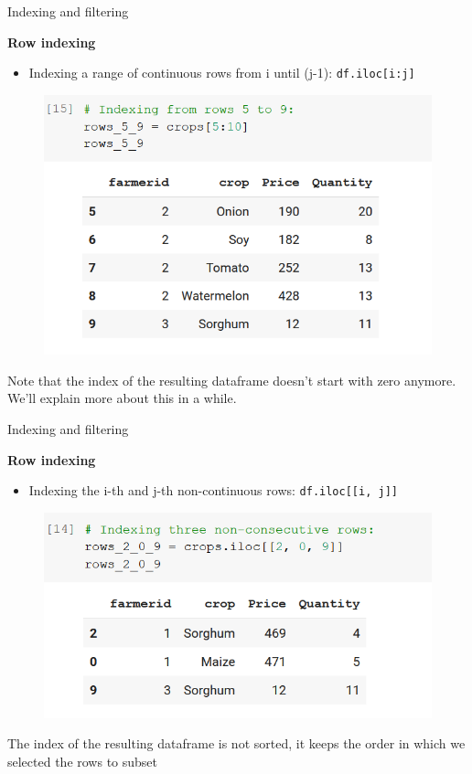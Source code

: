 \documentclass[aspectratio=169]{beamer}
\begin{document}
\begin{frame}{Indexing and filtering}

	\textbf{Row indexing}

	\begin{itemize}
		\item Indexing a range of continuous rows from i until (j-1): \texttt{df.iloc[i:j]}
	\end{itemize}

	\begin{figure}
		\centering
		\includegraphics[width=0.45\linewidth]{img/consecutive_rows.png}
	\end{figure}

	Note that the index of the resulting dataframe doesn't start with zero anymore. We'll explain more about this in a while.

\end{frame}

\begin{frame}{Indexing and filtering}

	\textbf{Row indexing}

	\begin{itemize}
		\item Indexing the i-th and j-th non-continuous rows: \texttt{df.iloc[[i, j]]}
	\end{itemize}

	\begin{figure}
		\centering
		\includegraphics[width=0.5\linewidth]{img/non-consecutive_rows.png}
	\end{figure}

	The index of the resulting dataframe is not sorted, it keeps the order in which we selected the rows to subset

\end{frame}
\end{document}
